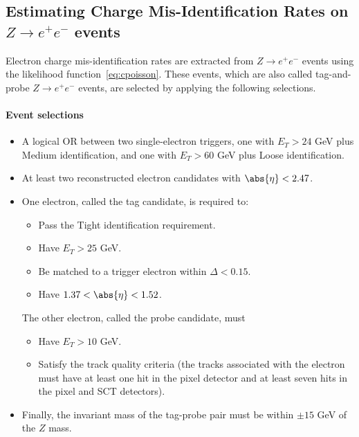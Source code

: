 \subsection{Estimating Charge Mis-Identification Rates on $Z\to e^+e^-$
	events}\label{s:zeerates}

Electron charge mis-identification rates are extracted from $Z\to e^+e^-$
events using the likelihood function~\ref{eq:cpoisson}. These events, which are
also called tag-and-probe $Z\to e^+e^-$ events, are selected by applying the
following selections.

\paragraph{Event selections}

\begin{itemize}

	\item A logical OR between two single-electron triggers, one with $E_T > 24$
	      GeV plus Medium identification, and one with $E_T > 60$ GeV plus Loose
	      identification.

	\item At least two reconstructed electron candidates with $\abs{\eta} < 2.47$.

	\item One electron, called the tag candidate, is required to:
	      \begin{itemize}
		      \item Pass the Tight identification requirement.
		      \item Have $E_T > 25$ GeV.
		      \item Be matched to a trigger electron within $\Delta < 0.15$.
		      \item Have $1.37 < \abs{\eta} < 1.52$.
	      \end{itemize}

	      The other electron, called the probe candidate, must
	      \begin{itemize}
		      \item Have $E_T > 10$ GeV.
		      \item Satisfy the track quality criteria (the tracks associated with the
		            electron must have at least one hit in the pixel detector and at least seven
		            hits in the pixel and SCT detectors).
	      \end{itemize}

	\item Finally, the invariant mass of the tag-probe pair must be within $\pm 15$
	      GeV of the $Z$ mass.

\end{itemize}

